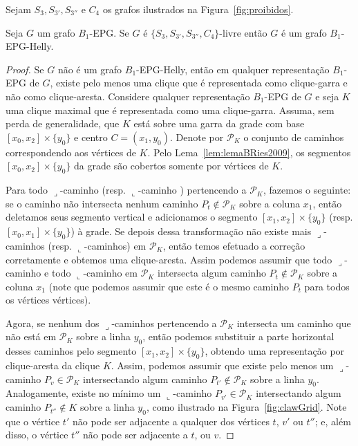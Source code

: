 Sejam $S_{3}, S_{3'}, S_{3''}$ e $ C_{4}$ os grafos ilustrados na  Figura~\ref{fig:proibidos}. 


\begin{theorem}
\label{lem:CordalDiamondFree}
Seja $G$ um grafo $B_1$-EPG. Se $G$ é  $\{S_{3}, S_{3'}, S_{3''}, C_{4}\}$-livre então $G$ é um grafo $B_1$-EPG-Helly.
\end{theorem}

\begin{proof}
Se $G$ não é um grafo $B_1$-EPG-Helly, então em qualquer representação $B_1$-EPG de $G$, existe pelo menos uma  clique que é representada como clique-garra e não como  clique-aresta. Considere qualquer representação $B_1$-EPG  de $G$  e seja $K$ uma clique maximal  que é representada como uma clique-garra. Assuma, sem perda de generalidade,  que $K$ está sobre uma garra da grade com base $[x_0, x_2]\times\{y_0\}$ e centro $C = (x_1, y_0)$. Denote por   $\mathcal{P}_K$ o conjunto de caminhos correspondendo aos  vértices de $K$. Pelo Lema~\ref{lem:lemaBRies2009}, os segmentos $[x_0, x_2]\times\{y_0\}$ da grade são cobertos somente por vértices de $K$. %


 Para todo ${\displaystyle \lrcorner}$-caminho %
 (resp. ${\displaystyle \llcorner}$-caminho 
 ) pertencendo a $\mathcal{P}_K$, fazemos o seguinte: se o caminho não intersecta nenhum caminho $P_t \notin\mathcal{P}_K$ sobre a  coluna $x_1$, então deletamos seus segmento vertical e adicionamos o segmento  $[x_1, x_2]\times\{y_0\}$ (resp. $[x_0, x_1]\times\{y_0\}$) à grade. Se depois dessa transformação não existe mais  ${\displaystyle \lrcorner}$-caminhos (resp. ${\displaystyle \llcorner}$-caminhos) em $\mathcal{P}_K$, então temos efetuado a correção corretamente e obtemos uma clique-aresta. Assim podemos assumir que todo  ${\displaystyle \lrcorner}$-caminho   e todo ${\displaystyle \llcorner}$-caminho  em $ \mathcal{P}_K$ intersecta algum caminho $P_t \notin \mathcal{P}_K$ sobre a  coluna $x_1$ (note que podemos assumir que este é o mesmo  caminho $P_t$ para todos os vértices vértices). 
 
 Agora, se nenhum dos  ${\displaystyle \lrcorner}$-caminhos pertencendo a $\mathcal{P}_K$ intersecta um caminho que não está em  $ \mathcal{P}_K$ sobre a linha $y_0$, então podemos substituir a parte  horizontal desses caminhos pelo segmento $[x_1,x_2]\times \{y_0\}$, obtendo uma representação por clique-aresta da clique $K$. Assim, podemos assumir que existe pelo menos um  ${\displaystyle \lrcorner}$-caminho $P_{v} \in \mathcal{P}_K$ intersectando algum caminho  $P_{t'} \notin \mathcal{P}_K$ sobre a linha $y_0$. Analogamente, existe no mínimo um  ${\displaystyle \llcorner}$-caminho $P_{v'} \in \mathcal{P}_K$ intersectando algum caminho $P_{t''} \notin K$ sobre a linha $y_0$, como ilustrado na Figura~\ref{fig:clawGrid}. Note que o vértice $t'$ não pode ser adjacente a qualquer dos vértices $t$, $v'$ ou $t''$; e, além disso, o vértice $t''$ não pode ser adjacente a $t$,  ou $v$.
 

\end{proof}
